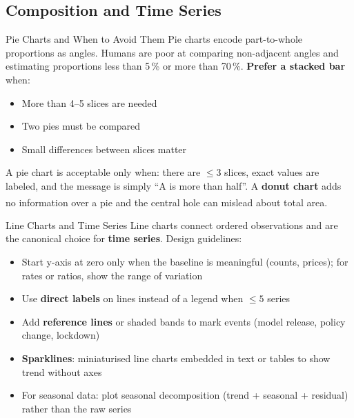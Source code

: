 \subsection{Composition and Time Series}

\begin{v3topic}{Pie Charts and When to Avoid Them}
    Pie charts encode part-to-whole proportions as angles. Humans are poor at comparing
    non-adjacent angles and estimating proportions less than 5\,\% or more than 70\,\%.
    \textbf{Prefer a stacked bar} when:
    \begin{itemize}
        \item More than 4--5 slices are needed
        \item Two pies must be compared
        \item Small differences between slices matter
    \end{itemize}
    A pie chart is acceptable only when: there are $\leq3$ slices, exact values are
    labeled, and the message is simply ``A is more than half''.
    A \textbf{donut chart} adds no information over a pie and the central hole
    can mislead about total
    area\textsuperscript{\cite[][pp.~95--100]{brucePracticalStatisticsData2017}}.

\end{v3topic}
\begin{v3topic}{Line Charts and Time Series}
    Line charts connect ordered observations and are the canonical choice for
    \textbf{time series}. Design guidelines:
    \begin{itemize}
        \item Start y-axis at zero only when the baseline is meaningful (counts, prices);
              for rates or ratios, show the range of variation
        \item Use \textbf{direct labels} on lines instead of a legend when $\leq5$ series
        \item Add \textbf{reference lines} or shaded bands to mark events (model release,
              policy change, lockdown)
        \item \textbf{Sparklines}: miniaturised line charts embedded in text or tables to
              show trend without axes
        \item For seasonal data: plot seasonal decomposition (trend + seasonal + residual)
              rather than the raw series
    \end{itemize}
\end{v3topic}

